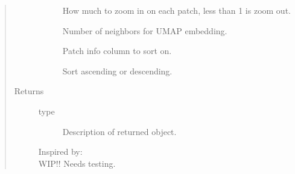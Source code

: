 \documentclass[letterpaper,10pt,english]{sphinxmanual}
\begin{document}
\begin{fulllineitems}
\begin{quote}
\begin{description}
\begin{description}
\item[{}] \leavevmode
How much to zoom in on each patch, less than 1 is zoom out.

\item[{}] \leavevmode
Number of neighbors for UMAP embedding.

\item[{}] \leavevmode
Patch info column to sort on.

\item[{}] \leavevmode
Sort ascending or descending.

\end{description}

\item[{Returns}] \leavevmode\begin{description}
\item[{type}] \leavevmode
Description of returned object.

\item[{Inspired by: }] \leavevmode
\item[{WIP!! Needs testing.}] \leavevmode
\end{description}

\end{description}\end{quote}

\end{fulllineitems}

\end{document}
